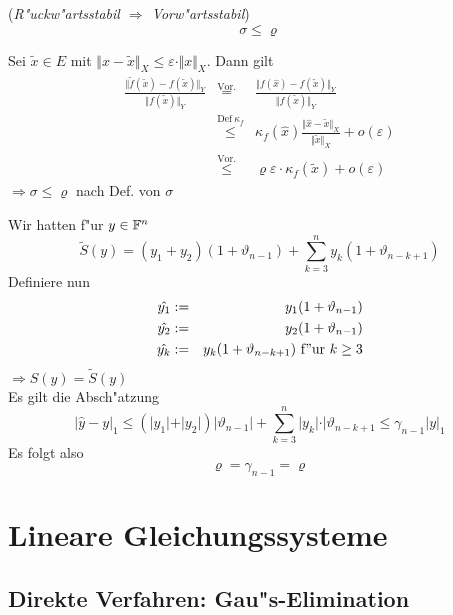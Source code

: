 \documentclass{scrartcl}
\begin{document}
\begin{Lemma} (\emph{R"uckw"artsstabil $\Rightarrow$ Vorw"artsstabil})
$$ \sigma \leq \varrho$$
\end{Lemma}
\begin{Bew}
Sei $\tilde{x} \in E$ mit $\Vert x - \tilde{x} \Vert_X \leq \varepsilon \cdot \Vert x \Vert_X$. Dann gilt \\
\begin{eqnarray*}
\frac{ \Vert \tilde{f} (\tilde{x}) - f(\tilde{x}) \Vert_Y}{\Vert f(\tilde{x}) \Vert_Y} & \stackrel{\mathrm{Vor.}}{=} & \frac{ \Vert f(\hat{x}) - f(\tilde{x}) \Vert_Y}{ \Vert f(\tilde{x}) \Vert_Y} \\ 
& \stackrel{\mathrm{Def \ } \kappa_f}{\leq} & \kappa_f(\hat{x}) \frac{ \Vert \hat{x} - \tilde{x} \Vert_X}{\Vert \tilde{x} \Vert_X} + o(\varepsilon) \\
& \stackrel{\mathrm{Vor.}}{\leq} & \varrho \varepsilon \cdot \kappa_f(\tilde{x}) + o(\varepsilon)
\end{eqnarray*}
$\Rightarrow \sigma \leq \varrho$ nach Def. von $\sigma$
\end{Bew} 
 Wir hatten f"ur $y \in \mathbb{F}^n$
$$ \tilde{S}(y) = (y_1 + y_2) (1 + \vartheta_{n-1}) + \sum\limits_{k=3}^n y_k (1 + \vartheta_{n-k+1})$$
Definiere nun 
\begin{eqnarray*}
\hat{y_1} & := & y_1 (1 + \vartheta_{n-1})\\
\hat{y_2} & := & y_2 (1 + \vartheta_{n-1}) \\
\hat{y_k} & := & y_k (1 + \vartheta_{n-k+1}) \ \mathrm{ f"ur \ } k \geq 3
\end{eqnarray*}
$\Rightarrow S(\hat{y}) = \tilde{S}(y)$ \\
Es gilt die Absch"atzung
$$\vert \hat{y} - y \vert_1 \leq (\vert y_1 \vert + \vert y_2 \vert ) \vert \vartheta_{n-1} \vert + \sum\limits_{k=3}^n \vert y_k \vert \cdot \vert \vartheta_{n-k+1} \leq \gamma_{n-1} \vert y \vert_1$$
Es folgt also
$$\varrho = \gamma_{n-1} = \varrho$$
\section{Lineare Gleichungssysteme}
\subsection{Direkte Verfahren: Gau"s-Elimination} 
\end{document}

